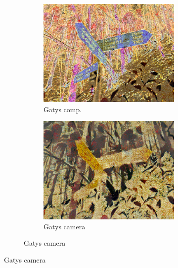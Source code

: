 \begin{figure}[]
\begin{subfigure}{\textwidth}
\begin{subfigure}{0.24\textwidth}
            \centering
            \includegraphics[width=\textwidth]{images/04-experiment02/photo/flowers2/gatys_im.jpg}
            \caption*{Gatys comp.}
        \end{subfigure}
        \hfill
        \begin{subfigure}{0.24\textwidth}
            \centering
            \includegraphics[width=\textwidth]{images/04-experiment02/photo/flowers2/gatys_proj.jpg}
            \caption*{Gatys camera}
        \end{subfigure}
        

\end{subfigure}
\end{figure}
